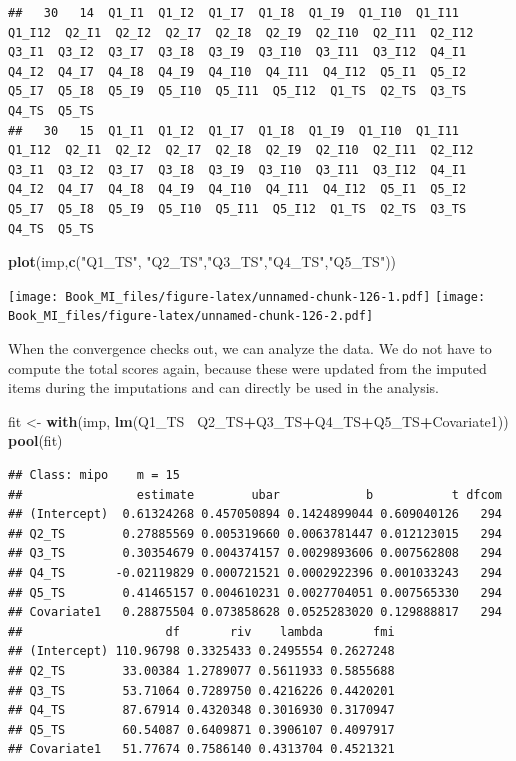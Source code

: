 \documentclass[]{book}
\newenvironment{Shaded}{\begin{snugshade}}{\end{snugshade}}
\newcommand{\KeywordTok}[1]{\textcolor[rgb]{0.13,0.29,0.53}{\textbf{#1}}}
\newcommand{\StringTok}[1]{\textcolor[rgb]{0.31,0.60,0.02}{#1}}
\newcommand{\OperatorTok}[1]{\textcolor[rgb]{0.81,0.36,0.00}{\textbf{#1}}}
\newcommand{\NormalTok}[1]{#1}
\begin{document}
\begin{verbatim}
##   30   14  Q1_I1  Q1_I2  Q1_I7  Q1_I8  Q1_I9  Q1_I10  Q1_I11  Q1_I12  Q2_I1  Q2_I2  Q2_I7  Q2_I8  Q2_I9  Q2_I10  Q2_I11  Q2_I12  Q3_I1  Q3_I2  Q3_I7  Q3_I8  Q3_I9  Q3_I10  Q3_I11  Q3_I12  Q4_I1  Q4_I2  Q4_I7  Q4_I8  Q4_I9  Q4_I10  Q4_I11  Q4_I12  Q5_I1  Q5_I2  Q5_I7  Q5_I8  Q5_I9  Q5_I10  Q5_I11  Q5_I12  Q1_TS  Q2_TS  Q3_TS  Q4_TS  Q5_TS
##   30   15  Q1_I1  Q1_I2  Q1_I7  Q1_I8  Q1_I9  Q1_I10  Q1_I11  Q1_I12  Q2_I1  Q2_I2  Q2_I7  Q2_I8  Q2_I9  Q2_I10  Q2_I11  Q2_I12  Q3_I1  Q3_I2  Q3_I7  Q3_I8  Q3_I9  Q3_I10  Q3_I11  Q3_I12  Q4_I1  Q4_I2  Q4_I7  Q4_I8  Q4_I9  Q4_I10  Q4_I11  Q4_I12  Q5_I1  Q5_I2  Q5_I7  Q5_I8  Q5_I9  Q5_I10  Q5_I11  Q5_I12  Q1_TS  Q2_TS  Q3_TS  Q4_TS  Q5_TS
\end{verbatim}

\begin{Shaded}
\begin{Highlighting}[]
\KeywordTok{plot}\NormalTok{(imp,}\KeywordTok{c}\NormalTok{(}\StringTok{"Q1_TS"}\NormalTok{, }\StringTok{"Q2_TS"}\NormalTok{,}\StringTok{"Q3_TS"}\NormalTok{,}\StringTok{"Q4_TS"}\NormalTok{,}\StringTok{"Q5_TS"}\NormalTok{))}
\end{Highlighting}
\end{Shaded}

\texttt{[image: Book\_MI\_files/figure-latex/unnamed-chunk-126-1.pdf]}
\texttt{[image: Book\_MI\_files/figure-latex/unnamed-chunk-126-2.pdf]}

When the convergence checks out, we can analyze the data. We do not have
to compute the total scores again, because these were updated from the
imputed items during the imputations and can directly be used in the
analysis.

\begin{Shaded}
\begin{Highlighting}[]
\NormalTok{fit <-}\StringTok{ }\KeywordTok{with}\NormalTok{(imp, }\KeywordTok{lm}\NormalTok{(Q1_TS}\OperatorTok{~}\StringTok{ }\NormalTok{Q2_TS}\OperatorTok{+}\NormalTok{Q3_TS}\OperatorTok{+}\NormalTok{Q4_TS}\OperatorTok{+}\NormalTok{Q5_TS}\OperatorTok{+}\NormalTok{Covariate1))}
\KeywordTok{pool}\NormalTok{(fit)}
\end{Highlighting}
\end{Shaded}

\begin{verbatim}
## Class: mipo    m = 15 
##                estimate        ubar            b           t dfcom
## (Intercept)  0.61324268 0.457050894 0.1424899044 0.609040126   294
## Q2_TS        0.27885569 0.005319660 0.0063781447 0.012123015   294
## Q3_TS        0.30354679 0.004374157 0.0029893606 0.007562808   294
## Q4_TS       -0.02119829 0.000721521 0.0002922396 0.001033243   294
## Q5_TS        0.41465157 0.004610231 0.0027704051 0.007565330   294
## Covariate1   0.28875504 0.073858628 0.0525283020 0.129888817   294
##                    df       riv    lambda       fmi
## (Intercept) 110.96798 0.3325433 0.2495554 0.2627248
## Q2_TS        33.00384 1.2789077 0.5611933 0.5855688
## Q3_TS        53.71064 0.7289750 0.4216226 0.4420201
## Q4_TS        87.67914 0.4320348 0.3016930 0.3170947
## Q5_TS        60.54087 0.6409871 0.3906107 0.4097917
## Covariate1   51.77674 0.7586140 0.4313704 0.4521321
\end{verbatim}
\end{document}
